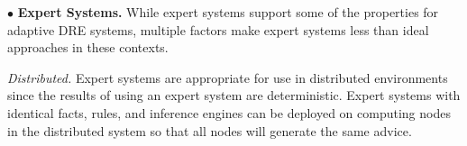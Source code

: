 \documentclass[conference]{IEEEtran}
\begin{document}
%
%

$\bullet$ {\bf Expert Systems.} While expert systems support some of the properties for adaptive DRE systems, multiple factors make expert systems less than ideal approaches in these contexts.

\emph{Distributed.} Expert systems are appropriate for use in distributed environments since the results of using an expert system are deterministic. Expert systems with identical facts, rules, and inference engines can be deployed on computing nodes in the distributed system so that all nodes will generate the same advice. 
\end{document}
